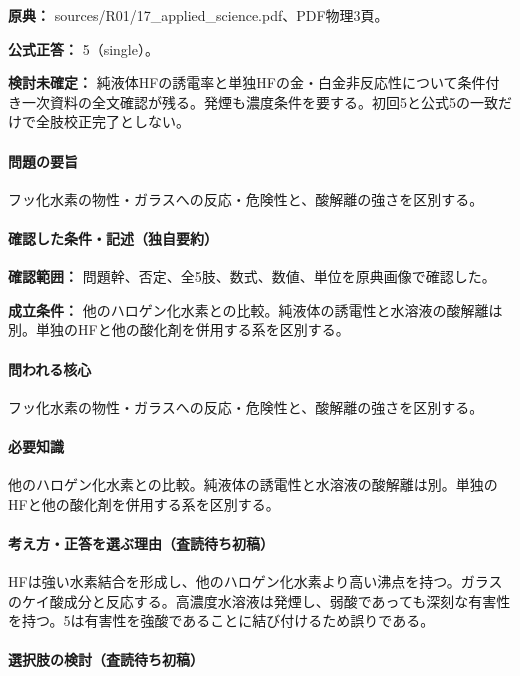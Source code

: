 \noindent\textbf{原典：} sources/R01/17\_applied\_science.pdf、PDF物理3頁。

\textbf{公式正答：} 5（single）。

\par\textbf{検討未確定：} 純液体HFの誘電率と単独HFの金・白金非反応性について条件付き一次資料の全文確認が残る。発煙も濃度条件を要する。初回5と公式5の一致だけで全肢校正完了としない。

\paragraph{問題の要旨} フッ化水素の物性・ガラスへの反応・危険性と、酸解離の強さを区別する。

\paragraph{確認した条件・記述（独自要約）}\mbox{}\par

\noindent\textbf{確認範囲：} 問題幹、否定、全5肢、数式、数値、単位を原典画像で確認した。\par

\noindent\textbf{成立条件：} 他のハロゲン化水素との比較。純液体の誘電性と水溶液の酸解離は別。単独のHFと他の酸化剤を併用する系を区別する。\par

\paragraph{問われる核心} フッ化水素の物性・ガラスへの反応・危険性と、酸解離の強さを区別する。

\paragraph{必要知識} 他のハロゲン化水素との比較。純液体の誘電性と水溶液の酸解離は別。単独のHFと他の酸化剤を併用する系を区別する。

\paragraph{考え方・正答を選ぶ理由（査読待ち初稿）} HFは強い水素結合を形成し、他のハロゲン化水素より高い沸点を持つ。ガラスのケイ酸成分と反応する。高濃度水溶液は発煙し、弱酸であっても深刻な有害性を持つ。5は有害性を強酸であることに結び付けるため誤りである。

\paragraph{選択肢の検討（査読待ち初稿）}\mbox{}\par

